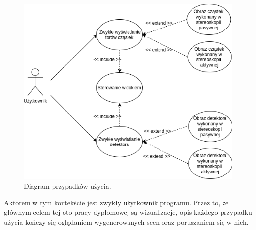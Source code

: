 \begin{figure}[H]
		\centering
 		\includegraphics[width=14.0cm]{UseCase.png}
    	\caption{Diagram przypadków użycia.}
 		\label{rys34}
\end{figure}

Aktorem w tym kontekście jest zwykły użytkownik programu. Przez to, że głównym celem tej oto pracy dyplomowej są wizualizacje, opis każdego przypadku użycia kończy się oglądaniem wygenerowanych scen oraz poruszaniem się w nich.

